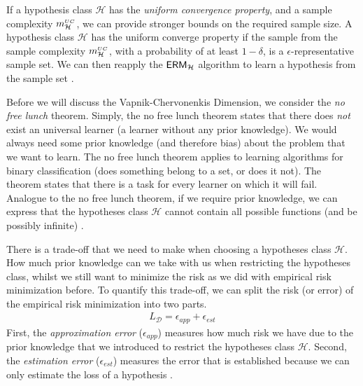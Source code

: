 \documentclass[../main.tex]{subfiles}
\begin{document}
If a hypothesis class $\mathcal{H}$ has the \emph{uniform convergence property}, and a sample complexity $m_{\mathcal{H}}^{\scriptscriptstyle UC}$,
we can provide stronger bounds on the required sample size.
A hypothesis class $\mathcal{H}$ has the uniform converge property if the sample from the sample complexity $m_{\mathcal{H}}^{\scriptscriptstyle UC}$,
with a probability of at least $1 - \delta$, is a $\epsilon$-representative sample set.
We can then reapply the $\mathsf{ERM}_{\mathcal{H}}$ algorithm to learn a hypothesis from the sample set
\cite[Chapter~4]{Shalev2014understanding}.


Before we will discuss the Vapnik-Chervonenkis Dimension, we consider the \emph{no free lunch} theorem.
Simply, the no free lunch theorem states that there does \emph{not} exist an universal learner (a learner without any prior knowledge).
We would always need some prior knowledge (and therefore bias) about the problem that we want to learn.
The no free lunch theorem applies to learning algorithms for binary classification (does something belong to a set, or does it not).
The theorem states that there is a task for every learner on which it will fail.
Analogue to the no free lunch theorem, if we require prior knowledge,
we can express that the hypotheses class $\mathcal{H}$ cannot contain all possible functions (and be possibly infinite)
\cite[Chapter~5]{Shalev2014understanding}.


There is a trade-off that we need to make when choosing a hypotheses class $\mathcal{H}$.
How much prior knowledge can we take with us when restricting the hypotheses class,
whilst we still want to minimize the risk as we did with empirical risk minimization before.
To quantify this trade-off, we can split the risk (or error) of the empirical risk minimization into two parts.
\begin{align}
    \label{eq:trade-off}
    L_{\mathcal{D}} = \epsilon_{app} + \epsilon_{est}
\end{align}
First, the \emph{approximation error} ($\epsilon_{app}$) measures how much risk we have due to the prior knowledge that we introduced to restrict the hypotheses class $\mathcal{H}$.
Second, the \emph{estimation error} ($\epsilon_{est}$) measures the error that is established because we can only estimate the loss of a hypothesis
\cite[Chapter~5]{Shalev2014understanding}.
\end{document}
